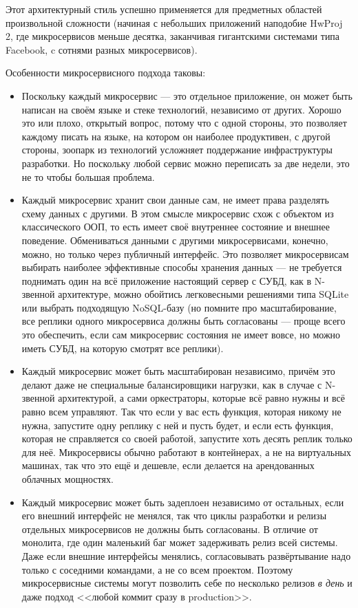 \documentclass[a5paper]{article}
\begin{document}
Этот архитектурный стиль успешно применяется для предметных областей произвольной сложности (начиная с небольших приложений наподобие HwProj 2, где микросервисов меньше десятка, заканчивая гигантскими системами типа Facebook, c сотнями разных микросервисов).

Особенности микросервисного подхода таковы:

\begin{itemize}
    \item Поскольку каждый микросервис --- это отдельное приложение, он может быть написан на своём языке и стеке технологий, независимо от других. Хорошо это или плохо, открытый вопрос, потому что с одной стороны, это позволяет каждому писать на языке, на котором он наиболее продуктивен, с другой стороны, зоопарк из технологий усложняет поддержание инфраструктуры разработки. Но поскольку любой сервис можно переписать за две недели, это не то чтобы большая проблема.
    \item Каждый микросервис хранит свои данные сам, не имеет права разделять схему данных с другими. В этом смысле микросервис схож с объектом из классического ООП, то есть имеет своё внутреннее состояние и внешнее поведение. Обмениваться данными с другими микросервисами, конечно, можно, но только через публичный интерфейс. Это позволяет микросервисам выбирать наиболее эффективные способы хранения данных --- не требуется поднимать один на всё приложение настоящий сервер с СУБД, как в N-звенной архитектуре, можно обойтись легковесными решениями типа SQLite или выбрать подходящую NoSQL-базу (но помните про масштабирование, все реплики одного микросервиса должны быть согласованы --- проще всего это обеспечить, если сам микросервис состояния не имеет вовсе, но можно иметь СУБД, на которую смотрят все реплики).
    \item Каждый микросервис может быть масштабирован независимо, причём это делают даже не специальные балансировщики нагрузки, как в случае с N-звенной архитектурой, а сами оркестраторы, которые всё равно нужны и всё равно всем управляют. Так что если у вас есть функция, которая никому не нужна, запустите одну реплику с ней и пусть будет, и если есть функция, которая не справляется со своей работой, запустите хоть десять реплик только для неё. Микросервисы обычно работают в контейнерах, а не на виртуальных машинах, так что это ещё и дешевле, если делается на арендованных облачных мощностях.
    \item Каждый микросервис может быть задеплоен независимо от остальных, если его внешний интерфейс не менялся, так что циклы разработки и релизы отдельных микросервисов не должны быть согласованы. В отличие от монолита, где один маленький баг может задерживать релиз всей системы. Даже если внешние интерфейсы менялись, согласовывать развёртывание надо только с соседними командами, а не со всем проектом. Поэтому микросервисные системы могут позволить себе по несколько релизов \emph{в день} и даже подход <<любой коммит сразу в production>>.

\end{itemize}
\end{document}
